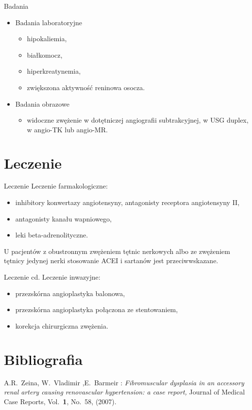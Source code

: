 \documentclass[]{beamer}
\begin{document}
\begin{frame}{Badania}
\begin{itemize}
\item<2-3>Badania laboratoryjne
\begin{itemize}
\item hipokaliemia,
\item białkomocz,
\item hiperkreatynemia,
\item zwiększona aktywność reninowa osocza.
\end{itemize}
\item<3>Badania obrazowe
\begin{itemize}
\item widoczne zwężenie w dotętniczej angiografii subtrakcyjnej, w USG duplex, w angio-TK lub angio-MR.
\end{itemize}
\end{itemize}
\end{frame}


\section{Leczenie}
\begin{frame}{Leczenie}
Leczenie farmakologiczne:
\begin{itemize}
\item inhibitory konwertazy angiotensyny, antagonisty receptora angiotensyny II,
\item antagonisty kanału wapniowego,
\item leki beta-adrenolityczne.
\end{itemize}
U pacjentów z obustronnym zwężeniem tętnic nerkowych albo ze zwężeniem tętnicy jedynej nerki stosowanie ACEI i sartanów jest przeciwwskazane.
\end{frame}
\begin{frame}{Leczenie cd.}
Leczenie inwazyjne:
\begin{itemize}
\item przezskórna angioplastyka balonowa,
\item przezskórna angioplastyka połączona ze stentowaniem,
\item korekcja chirurgiczna zwężenia.
\end{itemize}
\end{frame}

\section{Bibliografia}
\begin{thebibliography}{9}
 A.R.~Zeina, W.~Vladimir ,E.~Barmeir : \textit{Fibromuscular dysplasia in an accessory renal artery causing renovascular hypertension: a case report,}
Journal of Medical Case Reports,
Vol.~\textbf{1}, No.~58, (2007).
\end{thebibliography}
\end{document}
